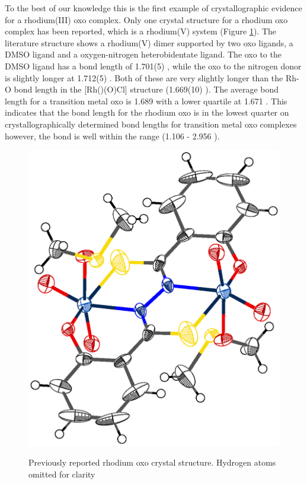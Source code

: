 To the best of our knowledge this is the first example of crystallographic evidence for a rhodium(III) oxo complex.  Only one crystal structure for a rhodium oxo complex has been reported, which is a rhodium(V) system (Figure \ref{Kaczul}).\cite{Gangopadhyay2010}  The literature structure shows a rhodium(V) dimer supported by two oxo ligands, a DMSO ligand and a oxygen-nitrogen heterobidentate ligand.  The oxo \trans{} to the DMSO ligand has a bond length of 1.701(5) \A, while the oxo \trans{} to the nitrogen donor is slightly longer at 1.712(5) \A.  Both of these are very slightly longer than the Rh-O bond length in the [Rh(\tBuxantphos)(O)Cl] structure (1.669(10) \A).  The average bond length for a transition metal oxo is 1.689 \A{} with a lower quartile at 1.671 \A.  This indicates that the bond length for the rhodium oxo is in the lowest quarter on crystallographically determined bond lengths for transition metal oxo complexes however, the bond is well within the range (1.106 - 2.956 \A).  

\begin{figure}[htb]
\begin{center}
\includegraphics[scale=0.7]{../Othercrystals/KACZUL.eps}
\caption[Previously reported rhodium oxo crystal structure]{Previously reported rhodium oxo crystal structure.\cite{Gangopadhyay2010} Hydrogen atoms omitted for clarity}
\vspace{0.2cm}
\label{Kaczul}
\end{center}
\end{figure}
\vspace{0.2cm}

